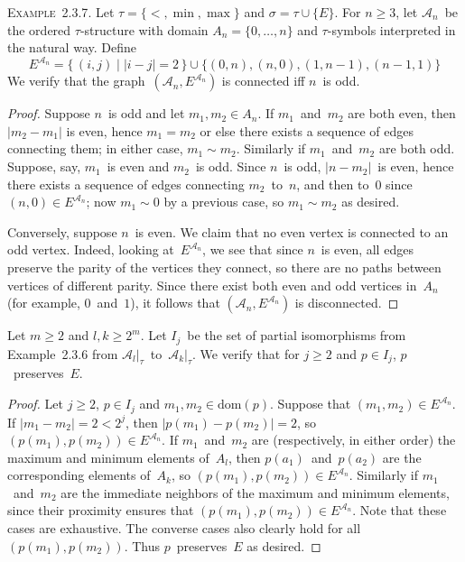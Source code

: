\documentclass[letterpaper]{article}
\newcommand{\A}{\mathcal{A}}
\newcommand{\dom}{\mathrm{dom}}
\newcommand{\con}{\sim}
\newcommand{\union}{\cup}
\newcommand{\abs}[1]{|{#1}|}
\newcommand{\example}[1]{\noindent\textsc{Example~{#1}.}}
\theoremstyle{plain}
\begin{document}
\example{2.3.7}
Let $\tau=\{<,\min,\max\}$ and $\sigma=\tau\union\{E\}$. For $n\ge3$, let $\A_n$~be the ordered $\tau$-structure with domain $A_n=\{0,\ldots,n\}$ and $\tau$-symbols interpreted in the natural way. Define
$$E^{\A_n}=\{\,(i,j)\mid\abs{i-j}=2\,\}\union\{(0,n),(n,0),(1,n-1),(n-1,1)\}$$
We verify that the graph~$(\A_n,E^{\A_n})$ is connected iff $n$~is odd.
\begin{proof}
Suppose $n$~is odd and let $m_1,m_2\in A_n$. If $m_1$~and~$m_2$ are both even, then $\abs{m_2-m_1}$ is even, hence $m_1=m_2$ or else there exists a sequence of edges connecting them; in either case, $m_1\con m_2$. Similarly if $m_1$~and~$m_2$ are both odd. Suppose, say, $m_1$~is even and $m_2$~is odd. Since $n$~is odd, $\abs{n-m_2}$~is even, hence there exists a sequence of edges connecting $m_2$~to~$n$, and then to~$0$ since $(n,0)\in E^{\A_n}$; now $m_1\con 0$ by a previous case, so $m_1\con m_2$ as desired.

Conversely, suppose $n$~is even. We claim that no even vertex is connected to an odd vertex. Indeed, looking at~$E^{\A_n}$, we see that since $n$~is even, all edges preserve the parity of the vertices they connect, so there are no paths between vertices of different parity. Since there exist both even and odd vertices in~$A_n$ (for example, $0$~and~$1$), it follows that $(\A_n,E^{\A_n})$ is disconnected.
\end{proof}

Let $m\ge2$ and $l,k\ge 2^m$. Let $I_j$~be the set of partial isomorphisms from Example~2.3.6 from $\A_l|_{\tau}$~to~$\A_k|_{\tau}$. We verify that for $j\ge 2$ and $p\in I_j$, $p$~preserves~$E$.
\begin{proof}
Let $j\ge 2$, $p\in I_j$ and $m_1,m_2\in\dom(p)$. Suppose that $(m_1,m_2)\in E^{\A_n}$. If $|m_1-m_2|=2<2^j$, then $|p(m_1)-p(m_2)|=2$, so $(p(m_1),p(m_2))\in E^{\A_n}$. If $m_1$~and~$m_2$ are (respectively, in either order) the maximum and minimum elements of~$A_l$, then $p(a_1)$~and~$p(a_2)$ are the corresponding elements of~$A_k$, so $(p(m_1),p(m_2))\in E^{\A_n}$. Similarly if $m_1$~and~$m_2$ are the immediate neighbors of the maximum and minimum elements, since their proximity ensures that $(p(m_1),p(m_2))\in E^{\A_n}$. Note that these cases are exhaustive. The converse cases also clearly hold for all $(p(m_1),p(m_2))$. Thus $p$~preserves~$E$ as desired.
\end{proof}
\end{document}
